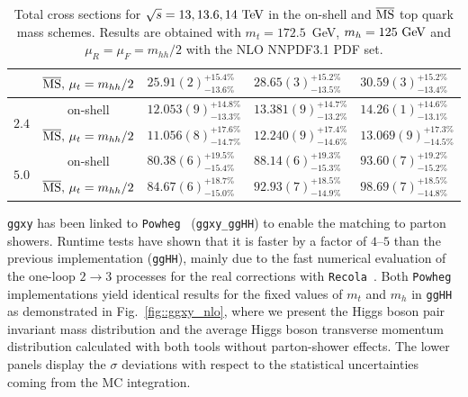 \begin{table}[t!]
\begin{tabular}{cc@{\hskip 7mm}lll}
              & $\overline{\rm MS},\,\mu_t=m_{hh}/2$ & $ 25.91(2)^{+15.4\%}_{-13.6\%} $ & $ 28.65(3)^{+15.2\%}_{-13.5\%} $ & $ 30.59(3)^{+15.2\%}_{-13.4\%} $ \\ %
        \midrule
        \multirow{2}{*}{$2.4$} & on-shell & $ 12.053(9)^{+14.8\%}_{-13.3\%} $ & $ 13.381(9)^{+14.7\%}_{-13.2\%} $ & $ 14.26(1)^{+14.6\%}_{-13.1\%} $  \\
              & $\overline{\rm MS},\,\mu_t=m_{hh}/2$ & $ 11.056(8)^{+17.6\%}_{-14.7\%} $ & $ 12.240(9)^{+17.4\%}_{-14.6\%} $ & $ 13.069(9)^{+17.3\%}_{-14.5\%} $  \\ %
        \midrule
        \multirow{2}{*}{$5.0$} & on-shell & $ 80.38(6)^{+19.5\%}_{-15.4\%} $ & $ 88.14(6)^{+19.3\%}_{-15.3\%} $ & $ 93.60(7)^{+19.2\%}_{-15.2\%} $ \\
              & $\overline{\rm MS},\,\mu_t=m_{hh}/2$ & $ 84.67(6)^{+18.7\%}_{-15.0\%} $ & $ 92.93(7)^{+18.5\%}_{-14.9\%} $ & $ 98.69(7)^{+18.5\%}_{-14.8\%} $ \\
        \bottomrule
    \end{tabular}
    \caption{Total cross sections for $\sqrt{s}=13, 13.6, 14~\textup{TeV}$ in the on-shell and $\overline{\rm MS}$ top quark mass schemes. Results are obtained with $m_t=172.5$~GeV, $m_h=125~\textup{GeV}$ and $\mu_R=\mu_F=m_{hh}/2$ with the NLO NNPDF3.1 \cite{NNPDF:2017mvq} PDF set.}   \label{tab::ggxy_kappa}
\end{table}

\texttt{ggxy} has been linked to \texttt{Powheg}~\cite{Alioli:2010xd} (\texttt{ggxy\_ggHH}) to enable the matching to parton showers. Runtime tests have shown that
it is faster by a factor of $4$--$5$ than the previous implementation ({\tt ggHH}),
mainly due to the fast numerical evaluation of the one-loop $2\to 3$ processes for the real corrections with {\tt Recola}~\cite{Actis:2012qn,Actis:2016mpe}. Both \texttt{Powheg} implementations yield identical results for the fixed values of $m_t$ and $m_h$ in {\tt ggHH} as demonstrated in Fig.~\ref{fig::ggxy_nlo}, where we present the Higgs boson pair invariant mass distribution and the average Higgs boson transverse momentum distribution calculated with both tools without parton-shower effects. The lower panels display the $\sigma$ deviations with respect to the statistical uncertainties coming from the MC integration.

